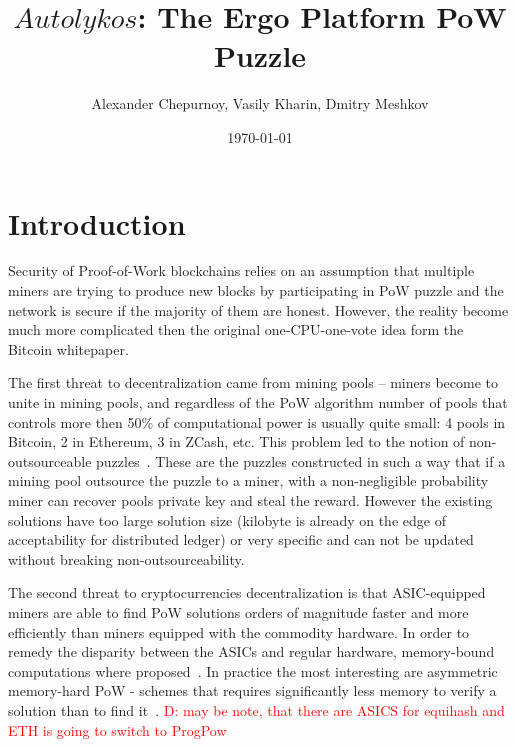 \documentclass[]{article}
\newcommand{\dnote}[1]{\textcolor{red}{D: {#1}}}
\newcommand{\Name}{$Autolykos$}
\begin{document}
    \title{\Name: The Ergo Platform PoW Puzzle}

    \author{Alexander Chepurnoy, Vasily Kharin, Dmitry Meshkov}

    \date{\today}
    \maketitle



    \section{Introduction}

    Security of Proof-of-Work blockchains relies on an assumption
    that multiple miners are trying to produce new blocks by
    participating in PoW puzzle and the network is secure if the
    majority of them are honest. However, the reality become much more complicated
    then the original one-CPU-one-vote idea form the Bitcoin whitepaper\cite{nakamoto2008bitcoin}.

    The first threat to decentralization came from mining pools -- miners become to unite in mining pools,
    and regardless of the PoW algorithm number of pools that controls more then 50\% of
    computational power is usually quite small: 4 pools in Bitcoin, 2 in Ethereum, 3 in ZCash, etc.
    This problem led to the notion of non-outsourceable puzzles~\cite{miller2015nonoutsourceable,daian2017piecework}.
    These are the puzzles constructed in such a way that if a mining pool outsource the puzzle
    to a miner, with a non-negligible probability miner can recover pools private key and steal the reward.
    However the existing solutions have too large solution size (kilobyte is already
    on the edge of acceptability for distributed ledger) or very specific and
    can not be updated without breaking non-outsourceability.

    The second threat to cryptocurrencies decentralization is that ASIC-equipped miners are
    able to find PoW solutions orders of magnitude faster and more efficiently
    than miners equipped with the commodity hardware. In order to remedy the
    disparity between the ASICs and regular hardware, memory-bound computations
    where proposed~\cite{dwork2003memory}. In practice the most interesting are
    asymmetric memory-hard PoW - schemes that requires significantly less memory
    to verify a solution than to find it~\cite{biryukov2017equihash,ethHash}.
    \dnote{may be note, that there are ASICS for equihash and ETH is going to switch to ProgPow}
\end{document}
